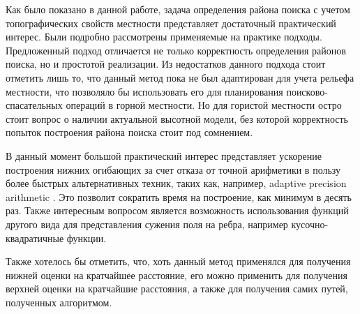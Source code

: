 \startconclusionpage

Как было показано в данной работе, задача определения района поиска
с учетом топографических свойств местности представляет
достаточный практический интерес. Были подробно рассмотрены применяемые
на практике подходы. Предложенный подход отличается не только
корректность определения районов поиска, но и простотой реализации.
Из недостатков данного подхода стоит отметить лишь то, что данный метод
пока не был адаптирован для учета рельефа местности, что позволяло бы
использовать его для планирования поисково-спасательных операций в горной
местности. Но для гористой местности остро стоит вопрос о наличии актуальной
высотной модели, без которой корректность попыток построения
района поиска стоит под сомнением.

В данный момент большой практический интерес представляет ускорение
построения нижних огибающих за счет отказа от точной арифметики в пользу более
быстрых альтернативных техник, таких как, например, adaptive precision
arithmetic \cite{APREC}. Это позволит сократить время на построение, как минимум в
десять раз. Также интересным вопросом является возможность использования
функций другого вида для представления сужения поля на ребра, например
кусочно-квадратичные функции.

Также хотелось бы отметить, что, хоть данный метод применялся для
получения нижней оценки на кратчайшее расстояние, его можно применить
для получения верхней оценки на кратчайшие расстояния, а также для получения
самих путей, полученных алгоритмом.

\FloatBarrier
